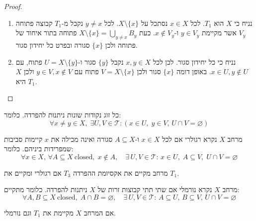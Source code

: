 \documentclass{tstextbook}
\begin{document}
\begin{proof}
  \begin{enumerate}
    \item נניח כי \(X\) הוא \(T_{1}\). לכל \(x \in X\) נסתכל על \(X \setminus \{  x \}\). לכל \(y \neq x\) נקבל מ-\(T_{1}\) קבוצה פתוחה \(V_{y}\) אשר מקיימת \(y \in V_{y}\) ו-\(x \not\in V_{y}\). כעת \(X\setminus \{ x \}=\bigcup_{y\neq x}B_{y}\) פתוחה בתור איחוד של פתוחה ולכן \(\{ x \}\) סגורה ובפרט כל יחידון סגור. 


    \item נניח כי כל יחידון סגור. לכן לכל \(x,y \in X\) נקבל \(\{ y \}\) סגור ו-\(U=X\setminus \{  y \}\) פתוח, עם \(x \in U,y\not\in U\). באופן דומה \(\{ x \}\) סגור ולכן \(V=X\setminus \{ x \}\) פתוח עם \(y\in V,x\not\in V\) ולכן \(X\) היא \(T_{1}\). 


  \end{enumerate}
\end{proof}
\begin{definition}
כל זוג נקודות שונות ניתנות להפרדה. כלומר:
$$\forall x\neq y\in X,\;\exists U,V\in{\mathcal{T}}:\left(x\in U,\;y\in V,\,U\cap V=\varnothing \right)$$

\end{definition}
\begin{definition}
מרחב \(X\) נקרא רגולרי אם לכל \(x \in X\) ו-\(A \subseteq X\) סגורה ואינה מכילה את \(x\) קיימות סביבות שמפרידות ביניהם. כלומר:
$$\forall x\in X,\,\forall A\subseteq X{\mathrm{~closed}},\;x\notin A,\quad\exists\,U,V\in{\mathcal{T}}:\,x\in U,\;A\subseteq V,\;U\cap V=\varnothing$$

\end{definition}
\begin{definition}
מרחב מקיים את אקסיומת ההפרדה \(T_{3}\) אם רגולרי ומקיים את \(T_{1}\).

\end{definition}
\begin{definition}
מרחב \(X\) נקרא נורמלי אם שתי תתי קבוצות זרות של \(X\) ניתנות להפרדה. כלומר מתקיים:
$$\forall A,B\subseteq X{\mathrm{~closed}},\;A\cap B=\varnothing,\quad\exists\,U,V\in{\mathcal{T}}:\,A\subseteq U,\,B\subseteq V,\,U\cap V=\varnothing$$

\end{definition}
\begin{definition}
אם המרחב \(X\) מקיימת את \(T_{1}\) וגם נורמלי.

\end{definition}
\end{document}
